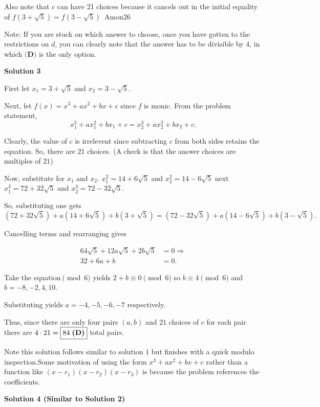 \begin{enumerate}
 Also note that $c$ can have 21 choices because it cancels out in the initial equality of $f\left(3+\sqrt 5\right)=f\left(3-\sqrt 5\right)$~Amon26

 Note: If you are stuck on which answer to choose, once you have gotten to the restrictions on $d$, you can clearly note that the answer has to be divisible by 4, in which $\textbf{(D)}$ is the only option.

 



\textbf{Solution 3}

First let $x_1=3+\sqrt5$ and $x_2=3-\sqrt5.$ 

 Next, let $f(x)=x^3+ax^2+bx+c$ since $f$ is monic. From the problem statement, 
 \[x_1^3+ax^2_1+bx_1+c=x_2^3+ax_2^2+bx_2+c.\]

 Clearly, the value of $c$ is irrelevent since subtracting $c$ from both sides retains the equation. So, there are $21$ choices. (A check is that the answer choices are multiples of $21$)

 Now, substitute for $x_1$ and $x_2.$
$x_1^2=14+6\sqrt5$ and $x_2^2=14-6\sqrt5$ next$x_1^3=72+32\sqrt5$ and $x_2^3=72-32\sqrt5$.

 So, substituting one gets 
 \[(72+32\sqrt5)+a(14+6\sqrt5)+b(3+\sqrt5)=(72-32\sqrt5)+a(14-6\sqrt5)+b(3-\sqrt5).\]

 Cancelling terms and rearranging gives 

 
 \begin{align*} 64\sqrt5+12a\sqrt5+2b\sqrt5&=0 \Rightarrow \\ 32+6a+b&=0. \end{align*}


 Take the equation$\pmod 6$ yields $2+b\equiv 0 \pmod 6$ so $b \equiv 4 \pmod 6$ and $b=-8, -2, 4, 10.$

 Substituting yields $a=-4, -5, -6, -7$ respectively. 

 Thus, since there are only four pairs $(a, b)$ and $21$ choices of $c$ for each pair there are $4\cdot21=\boxed{84\hspace{1mm}\textbf{(D)}}$ total pairs.

 Note this solution follows similar to solution $1$ but finishes with a quick modulo inspection.Some motivation of using the form $x^3+ax^2+bx+c$ rather than a function like $(x-r_1)(x-r_2)(x-r_3)$ is because the problem references the coefficients.

 



\textbf{Solution 4 (Similar to Solution 2)}


\end{enumerate}
